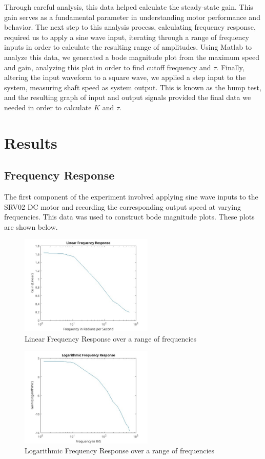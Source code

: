 \documentclass[conference,compsoc]{IEEEtran}
\begin{document}
  Through careful analysis, this data helped calculate the steady-state gain. This gain serves as a fundamental parameter in understanding motor performance and behavior. The next step to this analysis process, calculating frequency response, required us to apply a sine wave input, iterating through a range of frequency inputs in order to calculate the resulting range of amplitudes. Using Matlab to analyze this data, we generated a bode magnitude plot from the maximum speed and gain, analyzing this plot in order to find cutoff frequency and $\tau$. Finally, altering the input waveform to a square wave, we applied a step input to the system, measuring shaft speed as system output. This is known as the bump test, and the resulting graph of input and output signals provided the final data we needed in order to calculate $K$ and $\tau$. 

  \section{Results}

  \subsection{Frequency Response}
  The first component of the experiment involved applying sine wave inputs to the SRV02 DC motor and recording the corresponding output speed at varying frequencies. This data was used to construct bode magnitude plots. These plots are shown below.

  \begin{figure}[!t]
    \centering
    \includegraphics[width=2.5in]{LinearFrequencyResponse.jpg}
    \caption{Linear Frequency Response over a range of frequencies}
    \label{fig_sim}
  \end{figure}

  \begin{figure}[!t]
    \centering
    \includegraphics[width=2.5in]{LogFrequencyResponse.jpg}
    \caption{Logarithmic Frequency Response over a range of frequencies}
    \label{fig_sim}
  \end{figure}
\end{document}
